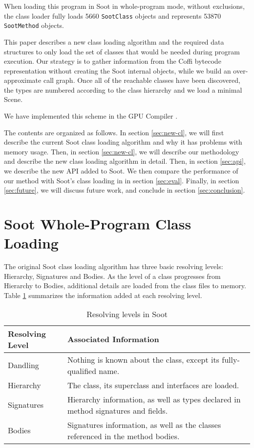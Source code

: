 \documentclass[preprint]{sigplanconf}
\begin{document}
When loading this program in Soot in whole-program mode, without exclusions, the class loader fully loads 5660 \texttt{SootClass} objects and represents 53870 \texttt{SootMethod} objects. %

This paper describes a new class loading algorithm and the required data structures to only load the set of classes that would be needed during program execution. Our strategy is to gather information from the Coffi bytecode representation without creating the Soot internal objects, while we build an over-approximate call graph. Once all of the reachable classes have been discovered, the types are numbered according to the class hierarchy and we load a minimal Scene.

We have implemented this scheme in the \rb GPU Compiler \cite{rootbeer}. 

The contents are organized as follows. In section \ref{sec:new-cl}, we will first describe the current Soot class loading algorithm and why it has problems with memory usage. Then, in section \ref{sec:new-cl}, we will describe our methodology and describe the new class loading algorithm in detail. Then, in section \ref{sec:api}, we describe the new API added to Soot. We then compare the performance of our method with Soot's class loading in \rb in section \ref{sec:eval}. Finally, in section \ref{sec:future}, we will discuss future work, and conclude in section \ref{sec:conclusion}.

\section{Soot Whole-Program Class Loading}
\label{sec:soot-cl}

The original Soot class loading algorithm has three basic resolving levels: Hierarchy, Signatures and Bodies. As the level of a class progresses from Hierarchy to Bodies, additional details are loaded from the class files to memory. Table \ref{tbl:resolving_levels} summarizes the information added at each resolving level. 

\begin{table}
\begin{tabularx}{\columnwidth}{|l|X|}
\hline
\textbf{Resolving Level} & \textbf{Associated Information} \\\hline
Dandling  & Nothing is known about the class, except its fully-qualified name.\\\hline
Hierarchy & The class, its superclass and interfaces are loaded. \\\hline
Signatures & Hierarchy information, as well as types declared in method signatures and fields. \\\hline
Bodies & Signatures information, as well as the classes referenced in the method bodies. \\\hline
\end{tabularx}
\caption{Resolving levels in Soot}
\label{tbl:resolving_levels}
\end{table}
\end{document}

